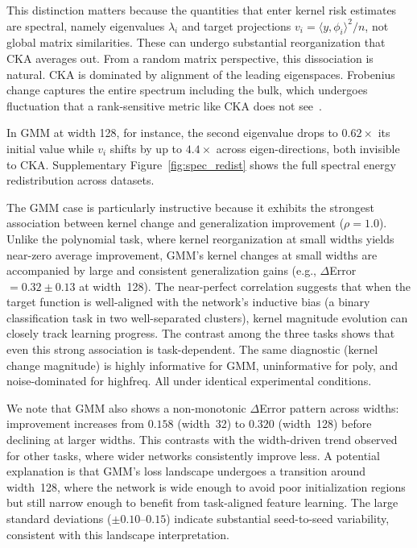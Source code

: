 \documentclass[twoside,11pt]{article}
\begin{document}
This distinction matters because the quantities that enter kernel risk estimates~\citep{canatar2021spectral} are spectral, namely eigenvalues $\lambda_{i}$ and target projections $v_{i}=\langle y,\phi_{i}\rangle^{2}/n$, not global matrix similarities.  These can undergo substantial reorganization that CKA averages out.  From a random matrix perspective, this dissociation is natural. CKA is dominated by alignment of the leading eigenspaces. Frobenius change captures the entire spectrum including the bulk, which undergoes fluctuation that a rank-sensitive metric like CKA does not see~\citep{el2010concentration}.

In GMM at width 128, for instance, the second eigenvalue drops to $0.62\times$ its initial value while $v_{i}$ shifts by up to $4.4\times$ across eigen-directions, both invisible to CKA.  Supplementary Figure~\ref{fig:spec_redist} shows the full spectral energy redistribution across datasets.

The GMM case is particularly instructive because it exhibits the strongest association between kernel change and generalization improvement ($\rho=1.0$).  Unlike the polynomial task, where kernel reorganization at small widths yields near-zero average improvement, GMM's kernel changes at small widths are accompanied by large and consistent generalization gains (e.g., $\Delta$Error $=0.32\pm0.13$ at width~128).  The near-perfect correlation suggests that when the target function is well-aligned with the network's inductive bias (a binary classification task in two well-separated clusters), kernel magnitude evolution can closely track learning progress.  The contrast among the three tasks shows that even this strong association is task-dependent. The same diagnostic (kernel change magnitude) is highly informative for GMM, uninformative for poly, and noise-dominated for highfreq. All under identical experimental conditions.

We note that GMM also shows a non-monotonic $\Delta$Error pattern across widths: improvement increases from $0.158$ (width~32) to $0.320$ (width~128) before declining at larger widths. This contrasts with the width-driven trend observed for other tasks, where wider networks consistently improve less. A potential explanation is that GMM's loss landscape undergoes a transition around width~128, where the network is wide enough to avoid poor initialization regions but still narrow enough to benefit from task-aligned feature learning. The large standard deviations ($\pm0.10$--$0.15$) indicate substantial seed-to-seed variability, consistent with this landscape interpretation.
\end{document}
